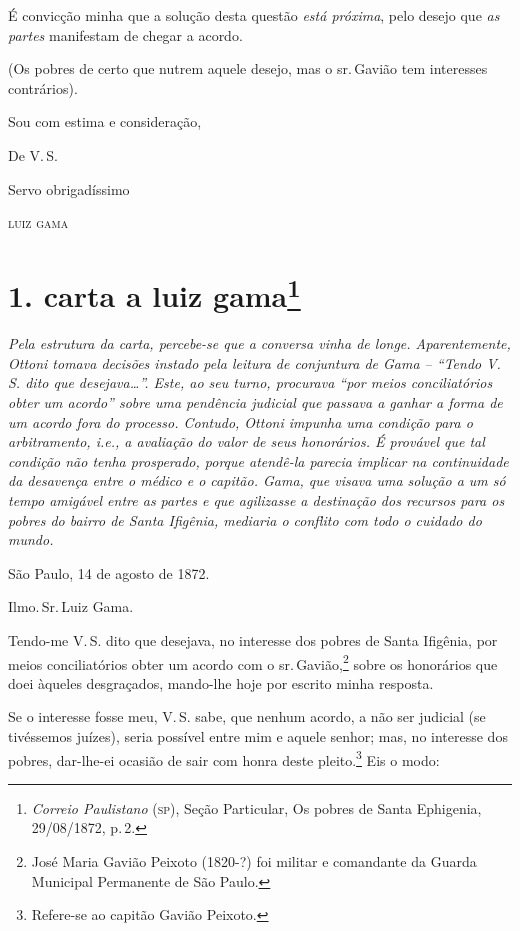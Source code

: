 É convicção minha que a solução desta questão \emph{está próxima}, pelo
desejo que \emph{as partes} manifestam de chegar a acordo.

(Os pobres de certo que nutrem aquele desejo, mas o sr.\,Gavião tem
interesses contrários).

\begin{flushright}
Sou com estima e consideração,

De V.\,S.

Servo obrigadíssimo

\textsc{luiz gama}
\end{flushright}

\chapter{1. carta a luiz gama\footnote{\emph{Correio Paulistano} (\textsc{sp}), Seção Particular, Os
  pobres de Santa Ephigenia, 29/08/1872, p.\,2.}} %

\begin{didascalia}
\emph{Pela estrutura da carta, percebe-se que a conversa vinha de longe.
Aparentemente, Ottoni tomava decisões instado pela leitura de conjuntura
de Gama -- ``Tendo V.\,S. dito que desejava\ldots{}''. Este, ao seu turno,
procurava ``por meios conciliatórios obter um acordo'' sobre uma pendência
judicial que passava a ganhar a forma de um acordo fora do processo.
Contudo, Ottoni impunha uma condição para o arbitramento, i.e., a
avaliação do valor de seus honorários. É provável que tal condição não
tenha prosperado, porque atendê-la parecia implicar na continuidade da
desavença entre o médico e o capitão. Gama, que visava uma solução a um
só tempo amigável entre as partes e que agilizasse a destinação dos
recursos para os pobres do bairro de Santa Ifigênia, mediaria o conflito
com todo o cuidado do mundo.}
\end{didascalia}


São Paulo, 14 de agosto de 1872.

Ilmo.\,Sr.\,Luiz Gama.

Tendo-me V.\,S. dito que desejava, no interesse dos pobres de Santa
Ifigênia, por meios conciliatórios obter um acordo com o sr.\,Gavião,\footnote{ José Maria Gavião Peixoto (1820-?) foi militar e
  comandante da Guarda Municipal Permanente de São Paulo.} sobre os
honorários que doei àqueles desgraçados, mando-lhe hoje por escrito
minha resposta.

Se o interesse fosse meu, V.\,S. sabe, que nenhum acordo, a não ser
judicial (se tivéssemos juízes), seria possível entre mim e aquele
senhor; mas, no interesse dos pobres, dar-lhe-ei ocasião de sair com
honra deste pleito.\footnote{ Refere-se ao capitão Gavião Peixoto.} Eis
o modo:


